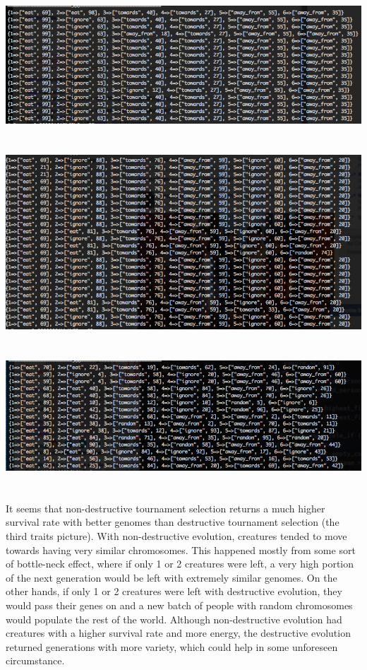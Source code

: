 \documentclass{article}
\begin{document}
\includegraphics[width=1.35\textwidth,height=1.35\textheight,keepaspectratio]{15traits}\\ \\ \\ 
\includegraphics[width=1.35\textwidth,height=1.35\textheight,keepaspectratio]{40non_traits} \\ \\ \\
\includegraphics[width=1.35\textwidth,height=1.35\textheight,keepaspectratio]{40des_traits}
\\ \\ \\ 

It seems that non-destructive tournament selection returns a much higher survival rate with better genomes than destructive tournament selection (the third traits picture).  With non-destructive evolution, creatures tended to move towards having very similar chromosomes.  This happened mostly from some sort of bottle-neck effect, where if only 1 or 2 creatures were left, a very high portion of the next generation would be left with extremely similar genomes.  On the other hands, if only 1 or 2 creatures were left with destructive evolution, they would pass their genes on and a new batch of people with random chromosomes would populate the rest of the world.  Although non-destructive evolution had creatures with a higher survival rate and more energy, the destructive evolution returned generations with more variety, which could help in some unforeseen circumstance. \\ 
\end{document}
